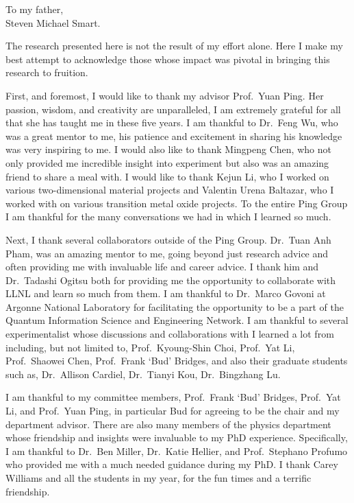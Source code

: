 \begin{dedication}
\vspace*{\fill}
\begin{center}
    To my father, \\
    Steven Michael Smart.
\end{center}
\vspace*{\fill}
\end{dedication}


\begin{acknowledgements}
    The research presented here is not the result of my effort alone. Here I make my best attempt to acknowledge those whose impact was pivotal in bringing this research to fruition.

    First, and foremost, I would like to thank my advisor Prof.\ Yuan Ping. Her passion, wisdom, and creativity are unparalleled, I am extremely grateful for all that she has taught me in these five years. I am thankful to Dr.\ Feng Wu, who was a great mentor to me, his patience and excitement in sharing his knowledge was very inspiring to me. I would also like to thank Mingpeng Chen, who not only provided me incredible insight into experiment but also was an amazing friend to share a meal with. I would like to thank Kejun Li, who I worked on various two-dimensional material projects and Valentin Urena Baltazar, who I worked with on various transition metal oxide projects. To the entire Ping Group I am thankful for the many conversations we had in which I learned so much.

    Next, I thank several collaborators outside of the Ping Group. Dr.\ Tuan Anh Pham, was an amazing mentor to me, going beyond just research advice and often providing me with invaluable life and career advice. I thank him and Dr.\ Tadashi Ogitsu both for providing me the opportunity to collaborate with LLNL and learn so much from them. I am thankful to Dr.\ Marco Govoni at Argonne National Laboratory for facilitating the opportunity to be a part of the Quantum Information Science and Engineering Network. I am thankful to several experimentalist whose discussions and collaborations with I learned a lot from including, but not limited to, Prof.\ Kyoung-Shin Choi, Prof.\ Yat Li, Prof.\ Shaowei Chen, Prof.\ Frank `Bud' Bridges, and also their graduate students such as, Dr.\ Allison Cardiel, Dr.\ Tianyi Kou, Dr.\ Bingzhang Lu.

    I am thankful to my committee members, Prof.\ Frank `Bud' Bridges, Prof.\ Yat Li, and Prof.\ Yuan Ping, in particular Bud for agreeing to be the chair and my department advisor. There are also many members of the physics department whose friendship and insights were invaluable to my PhD experience. Specifically, I am thankful to Dr.\ Ben Miller, Dr.\ Katie Hellier, and Prof.\ Stephano Profumo who provided me with a much needed guidance during my PhD. I thank Carey Williams and all the students in my year, for the fun times and a terrific friendship.


\end{acknowledgements}
